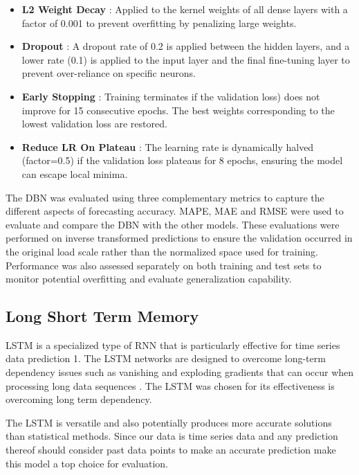  \begin{itemize}
 	\item \textbf{L2 Weight Decay} : Applied to the kernel weights of all dense layers with a factor of 0.001 to prevent overfitting by penalizing large weights.
 	\item \textbf{Dropout} : A dropout rate of 0.2 is applied between the hidden layers, and a lower rate (0.1) is applied to the input layer and the final fine-tuning layer to prevent over-reliance on specific neurons.
 	\item \textbf{Early Stopping} : Training terminates if the validation loss) does not improve for 15 consecutive epochs. The best weights corresponding to the lowest validation loss are restored.
 	\item \textbf{Reduce LR On Plateau} : The learning rate is dynamically halved (factor=0.5) if the validation loss plateaus for 8 epochs, ensuring the model can escape local minima.
 \end{itemize}
 
 The DBN was evaluated using three complementary metrics to capture the different aspects of forecasting accuracy. MAPE, MAE and RMSE were used to evaluate and compare the DBN with the other models. These evaluations were performed on inverse transformed predictions to ensure the validation occurred in the original load scale rather than the normalized space used for training. Performance was also assessed separately on both training and test sets to monitor potential overfitting and evaluate generalization capability.
 
 
 
 \subsection{Long Short Term Memory}
 
 LSTM is a specialized type of RNN that is particularly effective for time series data prediction \cite{rafi2021short}1. The LSTM networks are designed to overcome long-term dependency issues such as vanishing and exploding gradients that can occur when processing long data sequences \cite{boopathy2024deep}. The LSTM was chosen for its effectiveness is overcoming long term dependency. 
 
 The LSTM is versatile and also potentially produces more accurate solutions than statistical methods. Since our data is time series data and any prediction thereof should consider past data points to make an accurate prediction make this model a top choice for evaluation.
 
